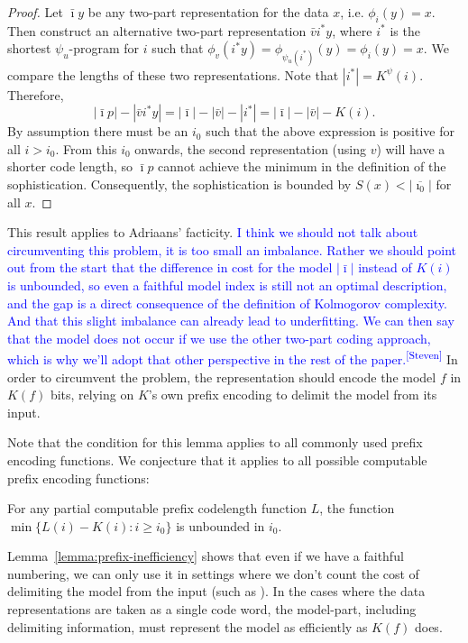 \documentclass{style/llncs}
\newcommand{\s}{S}
\newcommand{\sdr}[1]{\textcolor{blue}{\small #1\textsuperscript{[Steven]} }}
\begin{document}
\begin{proof}
Let $\bar\imath y$ be any two-part representation for the data $x$, i.e. $\phi_i(y)=x$. Then construct an alternative two-part representation $\bar vi^* y$, where $i^*$ is the shortest $\psi_u$-program for $i$ such that $\phi_v(i^* y)=\phi_{\psi_u(i^*)}(y) = \phi_i(y)=x$. We compare the lengths of these two representations. Note that $|i^*|=K^\psi(i)$. Therefore,
\[
|\bar\imath p|-|\bar v i^* y| = |\bar\imath|-|\bar v| - |i^*| = |\bar\imath|-|\bar v|-K(i).
\]
By assumption there must be an $i_0$ such that the above expression is positive for all $i>i_0$. From this $i_0$ onwards, the second representation (using $v$) will have a shorter code length, so $\bar\imath p$ cannot achieve the minimum in the definition of the sophistication. Consequently, the sophistication is bounded by $\s(x)<|\overline{\imath_0}|$ for all $x$. 
\end{proof}
This result applies to Adriaans' facticity\cite{adriaans2012facticity}. \sdr{I think we should not talk about circumventing this problem, it is too small an imbalance. Rather we should point out from the start that the difference in cost for the model $|\bar\imath|$ instead of $K(i)$ is unbounded, so even a faithful model index is still not an optimal description, and the gap is a direct consequence of the definition of Kolmogorov complexity. And that this slight imbalance can already lead to underfitting. We can then say that the model does not occur if we use the other two-part coding approach, which is why we'll adopt that other perspective in the rest of the paper.} In order to circumvent the problem, the representation should encode the model $f$ in $K(f)$ bits, relying on $K$'s own prefix encoding to delimit the model from its input.

Note that the condition for this lemma applies to all commonly used prefix encoding functions. We conjecture that it applies to all possible computable prefix encoding functions:

\begin{conjecture}
For any partial computable prefix codelength function $L$, the function $\min\{L(i)-K(i):i\ge i_0\}$
is unbounded in $i_0$.
\end{conjecture}

Lemma~\ref{lemma:prefix-inefficiency} shows that even if we have a faithful numbering, we can only use it in settings where we don't count the cost of delimiting the model from the input (such as \cite{koppelSoph1988}). In the cases where the data representations are taken as a single code word, the model-part, including delimiting information, must represent the model as efficiently as $K(f)$ does.  
\end{document}
